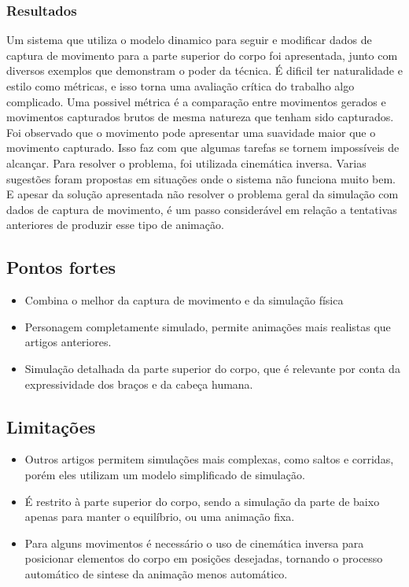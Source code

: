 \subsubsection{Resultados}
Um sistema que utiliza o modelo dinamico para seguir e modificar dados de captura de movimento para a parte superior do corpo foi apresentada, junto com diversos exemplos que demonstram o poder da técnica. É dificil ter naturalidade e estilo como métricas, e isso torna uma avaliação crítica do trabalho algo complicado. Uma possivel métrica é a comparação entre movimentos gerados e movimentos capturados brutos de mesma natureza que tenham sido capturados. Foi observado que o movimento pode apresentar uma suavidade maior que o movimento capturado. Isso faz com que algumas tarefas se tornem impossíveis de alcançar. Para resolver o problema, foi utilizada cinemática inversa. 
Varias sugestões foram propostas em situações onde o sistema não funciona muito bem. E apesar da solução apresentada não resolver o problema geral da simulação com dados de captura de movimento, é um passo considerável em relação a tentativas anteriores de produzir esse tipo de animação.

\subsection{Pontos fortes} %
\begin{itemize}
  \item Combina o melhor da captura de movimento e da simulação física
  \item Personagem completamente simulado, permite animações mais realistas que artigos anteriores.
  \item Simulação detalhada da parte superior do corpo, que é relevante por conta da expressividade dos braços e da cabeça humana.
\end{itemize}  

\subsection{Limitações} %
\begin{itemize}
  \item Outros artigos permitem simulações mais complexas, como saltos e corridas, porém eles utilizam um modelo simplificado de simulação.
  \item É restrito à parte superior do corpo, sendo a simulação da parte de baixo apenas para manter o equilíbrio, ou uma animação fixa.
  \item Para alguns movimentos é necessário o uso de cinemática inversa para posicionar elementos do corpo em posições desejadas, tornando o processo automático de sintese da animação menos automático.
\end{itemize} 

